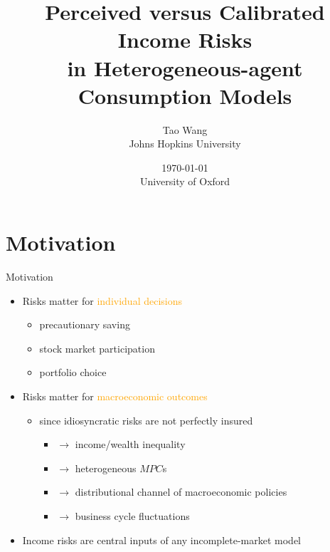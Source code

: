 \documentclass{beamer}
\title{Perceived versus Calibrated Income Risks \\ in Heterogeneous-agent Consumption Models}
\author{Tao Wang \\ Johns Hopkins University}
\date{\today \\
	University of Oxford}
\begin{document}
	
	
\begin{frame}
	\titlepage
\end{frame}

\section{Motivation}


\begin{frame}{Motivation}
	\begin{itemize}
		\item Risks matter for \textcolor{orange}{individual decisions}
		\begin{itemize}
			\item precautionary saving 
			\item stock market participation
			\item portfolio choice 
		\end{itemize} 
		\pause 
		\item Risks matter for \textcolor{orange}{macroeconomic outcomes}
		\begin{itemize}
			\item since idiosyncratic risks are not perfectly insured 
			\begin{itemize}
				\item $\rightarrow$ income/wealth inequality 
				\item $\rightarrow$ heterogeneous $MPC$s
				\item $\rightarrow$ distributional channel of macroeconomic policies 
				\item $\rightarrow$ business cycle fluctuations
			\end{itemize}
		\end{itemize}  %
		\pause
	\item Income risks are central inputs of any incomplete-market model   

\end{itemize}
\end{frame}
\end{document}
